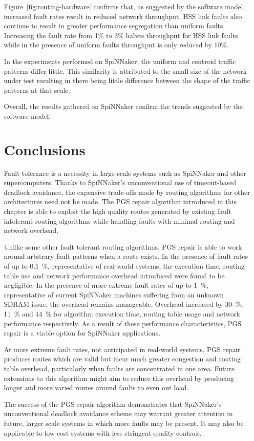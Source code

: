 				Figure~\ref{fig:routing-hardware} confirms that, as suggested by the
				software model, increased fault rates result in reduced network
				throughput. HSS link faults also continue to result in greater
				performance segregation than uniform faults. Increasing the fault rate
				from 1\% to 3\% halves throughput for HSS link faults while in the
				presence of uniform faults throughput is only reduced by 10\%.
				
				In the experiments performed on SpiNNaker, the uniform and centroid
				traffic patterns differ little. This similarity is attributed to the
				small size of the network under test resulting in there being little
				difference between the shape of the traffic patterns at that scale.
				
				Overall, the results gathered on SpiNNaker confirm the trends suggested
				by the software model.
		
	\section{Conclusions}
		
		Fault tolerance is a necessity in large-scale systems such as SpiNNaker and
		other supercomputers. Thanks to SpiNNaker's unconventional use of
		timeout-based deadlock avoidance, the expensive trade-offs made by routing
		algorithms for other architectures need not be made. The PGS repair
		algorithm introduced in this chapter is able to exploit the high quality
		routes generated by existing fault intolerant routing algorithms while
		handling faults with minimal routing and network overhead.
		
		Unlike some other fault tolerant routing algorithms, PGS repair is able to
		work around arbitrary fault patterns when a route exists. In the presence
		of fault rates of up to \SI{0.1}{\percent}, representative of real-world
		systems, the execution time, routing table use and network performance
		overhead introduced were found to be negligible.  In the presence of more
		extreme fault rates of up to \SI{1}{\percent}, representative of current
		SpiNNaker machines suffering from an unknown SDRAM issue, the overhead
		remains manageable. Overhead increased by \SI{30}{\percent},
		\SI{11}{\percent} and \SI{44}{\percent} for algorithm execution time,
		routing table usage and network performance respectively.  As a result of
		these performance characteristics, PGS repair is a viable option for
		SpiNNaker applications.
		
		At more extreme fault rates, not anticipated in real-world systems, PGS
		repair produces routes which are valid but incur much greater congestion
		and routing table overhead, particularly when faults are concentrated in
		one area. Future extensions to this algorithm might aim to reduce this
		overhead by producing longer and more varied routes around faults to even
		out load.
		
		The success of the PGS repair algorithm demonstrates that SpiNNaker's
		unconventional deadlock avoidance scheme may warrant greater attention in
		future, larger scale systems in which more faults may be present. It may
		also be applicable to low-cost systems with less stringent quality
		controls.
